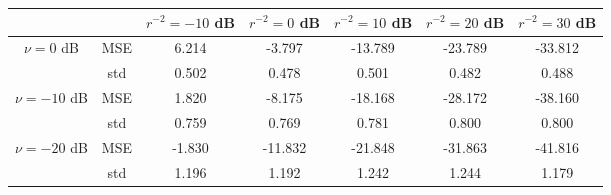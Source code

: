 \begin{tabular}{ccccccc}
\toprule
             &     &  $r^{-2}=-10$ dB &  $r^{-2}=0$ dB &  $r^{-2}=10$ dB &  $r^{-2}=20$ dB &  $r^{-2}=30$ dB \\
\midrule
$\nu=0$ dB & MSE &            6.214 &         -3.797 &         -13.789 &         -23.789 &         -33.812 \\
             & std &            0.502 &          0.478 &           0.501 &           0.482 &           0.488 \\ \hline
$\nu=-10$ dB & MSE &            1.820 &         -8.175 &         -18.168 &         -28.172 &         -38.160 \\
             & std &            0.759 &          0.769 &           0.781 &           0.800 &           0.800 \\ \hline
$\nu=-20$ dB & MSE &           -1.830 &        -11.832 &         -21.848 &         -31.863 &         -41.816 \\
             & std &            1.196 &          1.192 &           1.242 &           1.244 &           1.179 \\
\bottomrule
\end{tabular}
